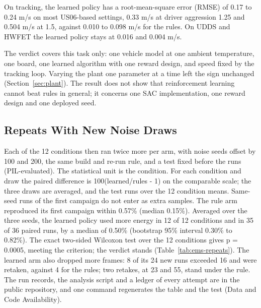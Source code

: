 \documentclass{ieeeaccess}
\begin{document}
On tracking, the learned policy has a root-mean-square error (RMSE) of 0.17 to 0.24 m/s on most US06-based settings, 0.33 m/s at driver aggression 1.25 and 0.504 m/s at 1.5, against 0.010 to 0.098 m/s for the rules. On UDDS and HWFET the learned policy stays at 0.016 and 0.004 m/s.

The verdict covers this task only: one vehicle model at one ambient temperature, one board, one learned algorithm with one reward design, and speed fixed by the tracking loop. Varying the plant one parameter at a time left the sign unchanged (Section~\ref{sec:plant}). The result does not show that reinforcement learning cannot beat rules in general; it concerns one SAC implementation, one reward design and one deployed seed.

\subsection{Repeats With New Noise Draws}

Each of the 12 conditions then ran twice more per arm, with noise seeds offset by 100 and 200, the same build and re-run rule, and a test fixed before the runs (PIL-evaluated). The statistical unit is the condition. For each condition and draw the paired difference is 100(learned/rules - 1) on the comparable scale; the three draws are averaged, and the test runs over the 12 condition means. Same-seed runs of the first campaign do not enter as extra samples. The rule arm reproduced its first campaign within 0.57\% (median 0.15\%). Averaged over the three seeds, the learned policy used more energy in 12 of 12 conditions and in 35 of 36 paired runs, by a median of 0.50\% (bootstrap 95\% interval 0.30\% to 0.82\%). The exact two-sided Wilcoxon test over the 12 conditions gives p = 0.0005, meeting the criterion; the verdict stands (Table~\ref{tab:ems-repeats}). The learned arm also dropped more frames: 8 of its 24 new runs exceeded 16 and were retaken, against 4 for the rules; two retakes, at 23 and 55, stand under the rule. The run records, the analysis script and a ledger of every attempt are in the public repository, and one command regenerates the table and the test (Data and Code Availability).
\end{document}
